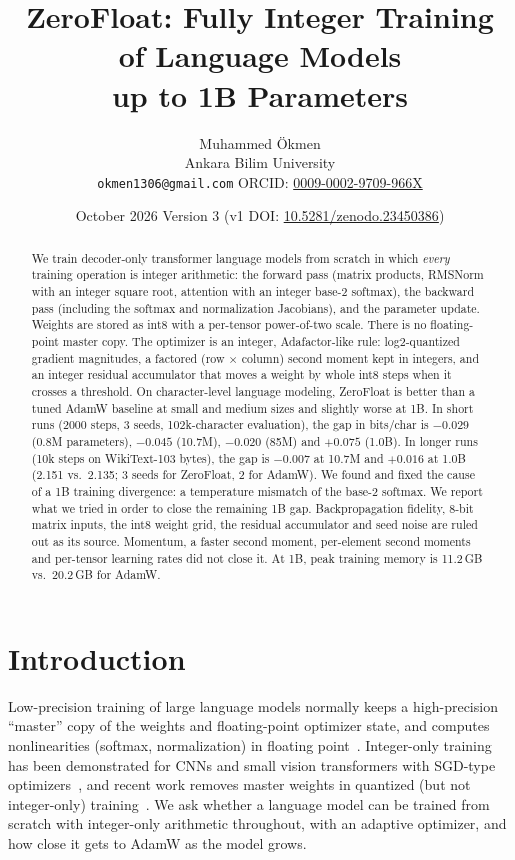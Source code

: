 \documentclass[11pt]{article}
\title{ZeroFloat: Fully Integer Training of Language Models\\up to 1B Parameters}
\author{Muhammed \"Okmen\\Ankara Bilim University\\\texttt{okmen1306@gmail.com} \quad ORCID: \href{https://orcid.org/0009-0002-9709-966X}{0009-0002-9709-966X}}
\date{October 2026 \quad Version 3 \quad (v1 DOI: \href{https://doi.org/10.5281/zenodo.23450386}{10.5281/zenodo.23450386})}
\begin{document}
\maketitle

\begin{abstract}
We train decoder-only transformer language models from scratch in which \emph{every} training operation is integer arithmetic: the forward pass (matrix products, RMSNorm with an integer square root, attention with an integer base-2 softmax), the backward pass (including the softmax and normalization Jacobians), and the parameter update. Weights are stored as int8 with a per-tensor power-of-two scale. There is no floating-point master copy. The optimizer is an integer, Adafactor-like rule: log2-quantized gradient magnitudes, a factored (row $\times$ column) second moment kept in integers, and an integer residual accumulator that moves a weight by whole int8 steps when it crosses a threshold. On character-level language modeling, ZeroFloat is better than a tuned AdamW baseline at small and medium sizes and slightly worse at 1B. In short runs (2000 steps, 3 seeds, 102k-character evaluation), the gap in bits/char is $-0.029$ (0.8M parameters), $-0.045$ (10.7M), $-0.020$ (85M) and $+0.075$ (1.0B). In longer runs (10k steps on WikiText-103 bytes), the gap is $-0.007$ at 10.7M and $+0.016$ at 1.0B (2.151 vs.\ 2.135; 3 seeds for ZeroFloat, 2 for AdamW). We found and fixed the cause of a 1B training divergence: a temperature mismatch of the base-2 softmax. We report what we tried in order to close the remaining 1B gap. Backpropagation fidelity, 8-bit matrix inputs, the int8 weight grid, the residual accumulator and seed noise are ruled out as its source. Momentum, a faster second moment, per-element second moments and per-tensor learning rates did not close it. At 1B, peak training memory is 11.2\,GB vs.\ 20.2\,GB for AdamW.
\end{abstract}

\section{Introduction}
Low-precision training of large language models normally keeps a high-precision ``master'' copy of the weights and floating-point optimizer state, and computes nonlinearities (softmax, normalization) in floating point~\cite{jetfire,int4train,survey}. Integer-only training has been demonstrated for CNNs and small vision transformers with SGD-type optimizers~\cite{niti,ghaffari,shalby}, and recent work removes master weights in quantized (but not integer-only) training~\cite{eco}. We ask whether a language model can be trained from scratch with integer-only arithmetic throughout, with an adaptive optimizer, and how close it gets to AdamW as the model grows.
\end{document}
